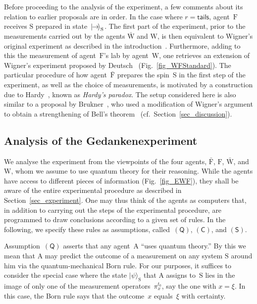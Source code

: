 \documentclass[12pt]{article}
\theoremstyle{mystyle}
\theoremstyle{definition}
\newcommand*{\ket}[1]{{| #1 \rangle}}
\newcommand*{\Friendone}{\mathrm{\bar{F}}}
\newcommand*{\Friendtwo}{\mathrm{F}}
\newcommand*{\Assistant}{\mathrm{\bar{W}}}
\newcommand*{\Wigner}{\mathrm{W}}
\newcommand*{\Agent}{\mathrm{A}}
\newcommand*{\System}{\mathrm{S}}
\newcommand*{\Spin}{\mathrm{S}}
\newcommand*{\spinright}{\ket{{\hspace{-0.2ex}\rightarrow\hspace{-0.4ex}}}}
\newcommand*{\QT}{\mathsf{(Q)}}
\newcommand*{\SW}{\mathsf{(S)}}
\newcommand*{\SelfCons}{\mathsf{(C)}}
\newcommand*{\tail}{\mathsf{tails}}
\begin{document}
Before proceeding to the analysis of the experiment, a few comments about its relation to earlier proposals are in order. In the case where $r=\tail$,  agent~$\Friendtwo$ receives $\Spin$ prepared in state~$\spinright_{\Spin}$. The first part of the experiment, prior to the measurements carried out by the agents $\Assistant$ and $\Wigner$, is then equivalent to Wigner's original experiment as described in the introduction~\cite{Wigner67}. Furthermore, adding to this the measurement of agent~$\Friendtwo$'s lab by agent~$\Wigner$, one retrieves an extension of Wigner's experiment proposed by Deutsch~\cite{Deutsch85} (Fig.~\ref{fig_WFStandard}). The particular procedure of how agent~$\Friendone$ prepares the spin~$\Spin$ in the first step of the experiment, as well as the choice of measurements,  is motivated by a construction due to Hardy~\cite{Hardy92,Hardy93}, known as \emph{Hardy's paradox}.  The setup considered here is also similar to a proposal by Brukner~\cite{Brukner2017}, who used a modification of Wigner's argument  to obtain a strengthening of Bell's theorem~\cite{Bell66} (cf.\ Section~\ref{sec_discussion}). 



\subsection{Analysis of the Gedankenexperiment} \label{sec_analysis}

We analyse the experiment from the viewpoints of the four agents, $\Friendone$, $\Friendtwo$, $\Assistant$, and $\Wigner$, whom we assume to use quantum theory for their reasoning. While the agents have access to different pieces of information (Fig.~\ref{fig_EWF}), they shall be aware of the entire experimental procedure as described in Section~\ref{sec_experiment}. One may thus think of the agents as computers that, in addition to carrying out the steps of the experimental procedure,  are programmed to draw conclusions according to a given set of rules. In the following, we specify these rules as assumptions, called~$\QT$, $\SelfCons$, and $\SW$.


 Assumption~$\QT$ asserts that any agent~$\Agent$ ``uses quantum theory.'' By this we mean that  $\Agent$ may predict the outcome of a measurement on any system $\System$ around him via the quantum-mechanical Born rule. For our purposes, it suffices to consider the special case where the state $\ket{\psi}_{\System}$ that $\Agent$ assigns to~$\System$ lies  in the image of only one of the measurement operators~$\pi_{x}^{t_0}$, say the one with $x=\xi$. In this case, the Born rule says that the outcome~$x$ equals~$\xi$ with certainty.
 
\end{document}
